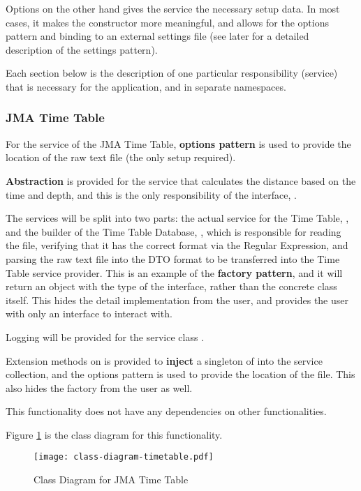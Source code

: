 Options on the other hand gives the service the necessary setup data. In most cases, it makes the constructor more meaningful, and allows for the options pattern and binding to an external settings file (see later for a detailed description of the settings pattern).

Each section below is the description of one particular responsibility (service) that is necessary for the application, and in separate namespaces.

\subsubsection{JMA Time Table}

For the service of the JMA Time Table, \textbf{options pattern} is used to provide the location of the raw text file (the only setup required).

\textbf{Abstraction} is provided for the service that calculates the distance based on the time and depth, and this is the only responsibility of the interface, .

The services will be split into two parts: the actual service for the Time Table, , and the builder of the Time Table Database, , which is responsible for reading the file, verifying that it has the correct format via the Regular Expression, and parsing the raw text file into the DTO format to be transferred into the Time Table service provider. This is an example of the \textbf{factory pattern}, and it will return an object with the type of the interface, rather than the concrete class itself. This hides the detail implementation from the user, and provides the user with only an interface to interact with.

Logging will be provided for the service class .

Extension methods on  is provided to \textbf{inject} a singleton of  into the service collection, and the options pattern is used to provide the location of the file. This also hides the factory from the user as well.

This functionality does not have any dependencies on other functionalities.

Figure \ref{fig:class-diagram-timetable} is the class diagram for this functionality.

\begin{figure}[htp]
    \centering
    \texttt{[image: class-diagram-timetable.pdf]}
    \caption{Class Diagram for JMA Time Table}
    \label{fig:class-diagram-timetable}
\end{figure}

